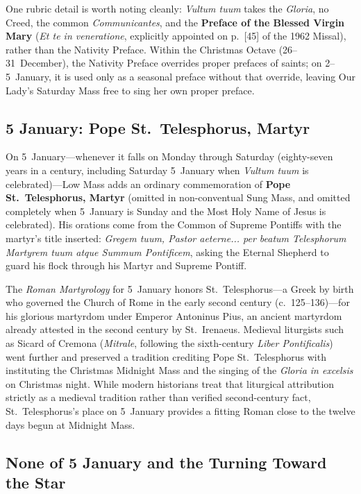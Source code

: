 One rubric detail is worth noting cleanly: \textit{Vultum tuum} takes the
\textit{Gloria}, no Creed, the common \textit{Communicantes}, and the
\textbf{Preface of the Blessed Virgin Mary} (\textit{Et te in veneratione},
explicitly appointed on p.~[45] of the 1962 Missal), rather than the Nativity
Preface. Within the Christmas Octave (26--31~December), the Nativity Preface
overrides proper prefaces of saints; on 2--5~January, it is used only as a
seasonal preface without that override, leaving Our Lady's Saturday Mass free
to sing her own proper preface.

\subsection{5 January: Pope St.~Telesphorus, Martyr}

On 5~January---whenever it falls on Monday through Saturday (eighty-seven years
in a century, including Saturday 5~January when \textit{Vultum tuum} is
celebrated)---Low Mass adds an ordinary commemoration of \textbf{Pope
St.~Telesphorus, Martyr} (omitted in non-conventual Sung Mass, and omitted
completely when 5~January is Sunday and the Most Holy Name of Jesus is
celebrated). His orations come from the Common of Supreme Pontiffs with the
martyr's title inserted: \textit{Gregem tuum, Pastor aeterne... per beatum
Telesphorum Martyrem tuum atque Summum Pontificem}, asking the Eternal
Shepherd to guard his flock through his Martyr and Supreme Pontiff.

The \textit{Roman Martyrology} for 5~January honors St.~Telesphorus---a Greek
by birth who governed the Church of Rome in the early second century
(c.~125--136)---for his glorious martyrdom under Emperor Antoninus Pius, an
ancient martyrdom already attested in the second century by St.~Irenaeus.
Medieval liturgists such as Sicard of Cremona (\textit{Mitrale}, following the
sixth-century \textit{Liber Pontificalis}) went further and preserved a
tradition crediting Pope St.~Telesphorus with instituting the Christmas
Midnight Mass and the singing of the \textit{Gloria in excelsis} on Christmas
night. While modern historians treat that liturgical attribution strictly as a
medieval tradition rather than verified second-century fact, St.~Telesphorus's
place on 5~January provides a fitting Roman close to the twelve days begun at
Midnight Mass.

\subsection{None of 5 January and the Turning Toward the Star}

